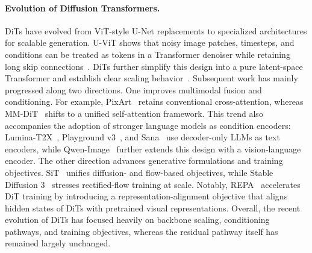 \documentclass{llmxive}
\begin{document}
\paragraph{Evolution of Diffusion Transformers.} DiTs have evolved from ViT-style U-Net replacements to specialized architectures for scalable generation. U-ViT shows that noisy image patches, timesteps, and conditions can be treated as tokens in a Transformer denoiser while retaining long skip connections~\citep{bao2023all}. DiTs further simplify this design into a pure latent-space Transformer and establish clear scaling behavior~\citep{peebles2023scalable}. Subsequent work has mainly progressed along two directions. One improves multimodal fusion and conditioning. For example, PixArt~\citep{chen2024pixart, chen2023pixart, chen2024pixartdelta} retains conventional cross-attention, whereas MM-DiT~\citep{esser2024scaling} shifts to a unified self-attention framework. This trend also accompanies the adoption of stronger language models as condition encoders: Lumina-T2X~\citep{gao2024lumina}, Playground v3~\citep{Liu2024PlaygroundVI}, and Sana~\citep{xie2024sana} use decoder-only LLMs as text encoders, while Qwen-Image~\citep{wu2025qwen} further extends this design with a vision-language encoder. The other direction advances generative formulations and training objectives. SiT~\citep{ma2024sit} unifies diffusion- and flow-based objectives, while Stable Diffusion 3~\citep{esser2024scaling} stresses rectified-flow training at scale. Notably, REPA~\citep{yu2025repa} accelerates DiT training by introducing a representation-alignment objective that aligns hidden states of DiTs with pretrained visual representations. Overall, the recent evolution of DiTs has focused heavily on backbone scaling, conditioning pathways, and training objectives, whereas the residual pathway itself has remained largely unchanged.


\end{document}
